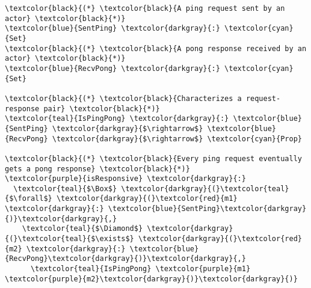 \begin{Verbatim}[commandchars=\\\{\},codes={\catcode`$=3}]
\textcolor{black}{(*} \textcolor{black}{A ping request sent by an actor} \textcolor{black}{*)}
\textcolor{blue}{SentPing} \textcolor{darkgray}{:} \textcolor{cyan}{Set}
\textcolor{black}{(*} \textcolor{black}{A pong response received by an actor} \textcolor{black}{*)}
\textcolor{blue}{RecvPong} \textcolor{darkgray}{:} \textcolor{cyan}{Set}

\textcolor{black}{(*} \textcolor{black}{Characterizes a request-response pair} \textcolor{black}{*)}
\textcolor{teal}{IsPingPong} \textcolor{darkgray}{:} \textcolor{blue}{SentPing} \textcolor{darkgray}{$\rightarrow$} \textcolor{blue}{RecvPong} \textcolor{darkgray}{$\rightarrow$} \textcolor{cyan}{Prop}

\textcolor{black}{(*} \textcolor{black}{Every ping request eventually gets a pong response} \textcolor{black}{*)}
\textcolor{purple}{isResponsive} \textcolor{darkgray}{:} 
  \textcolor{teal}{$\Box$} \textcolor{darkgray}{(}\textcolor{teal}{$\forall$} \textcolor{darkgray}{(}\textcolor{red}{m1} \textcolor{darkgray}{:} \textcolor{blue}{SentPing}\textcolor{darkgray}{)}\textcolor{darkgray}{,} 
    \textcolor{teal}{$\Diamond$} \textcolor{darkgray}{(}\textcolor{teal}{$\exists$} \textcolor{darkgray}{(}\textcolor{red}{m2} \textcolor{darkgray}{:} \textcolor{blue}{RecvPong}\textcolor{darkgray}{)}\textcolor{darkgray}{,} 
      \textcolor{teal}{IsPingPong} \textcolor{purple}{m1} \textcolor{purple}{m2}\textcolor{darkgray}{)}\textcolor{darkgray}{)}
\end{Verbatim}
